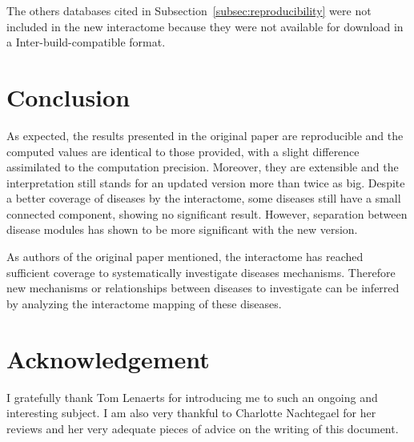 \documentclass[letterpaper]{article}
\begin{document}
		The others databases cited in Subsection~\ref{subsec:reproducibility} were not included in the new
		interactome because they were not available for download in a Inter-build-compatible format.

\section{Conclusion}
As expected, the results presented in the original paper are reproducible and the computed values are
identical to those provided, with a slight difference assimilated to the computation precision.
Moreover, they are extensible and the interpretation still stands for an updated version more than
twice as big. Despite a better coverage of diseases by the interactome, some diseases still have a
small connected component, showing no significant result. However, separation between disease modules has
shown to be more significant with the new version.

As authors of the original paper mentioned, the interactome has reached sufficient coverage to
systematically investigate diseases mechanisms. Therefore new mechanisms or relationships between
diseases to investigate can be inferred by analyzing the interactome mapping of these diseases.

\section*{Acknowledgement}
I gratefully thank Tom Lenaerts for introducing me to such an ongoing and interesting subject.
I am also very thankful to Charlotte Nachtegael for her reviews and her very adequate pieces
of advice on the writing of this document.

\footnotesize

{}
\end{document}
